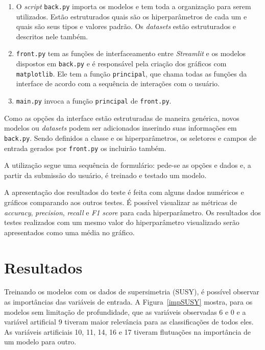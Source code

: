\documentclass[12pt]{article}
\begin{document}
\begin{enumerate}
	\item O \textit{script} \texttt{back.py} importa os modelos e tem toda a organização para serem utilizados.
	Estão estruturados quais são os hiperparâmetros de cada um e quais são seus tipos e valores padrão.
	Os \textit{datasets} estão estruturados e descritos nele também.
	
	\item \texttt{front.py} tem as funções de interfaceamento entre \textit{Streamlit} e os modelos dispostos em \texttt{back.py} e é responsável pela criação dos gráficos com \texttt{matplotlib}.
	Ele tem a função \texttt{principal}, que chama todas as funções da interface de acordo com a sequência de interações com o usuário.
	
	\item \texttt{main.py} invoca a função \texttt{principal} de \texttt{front.py}.
\end{enumerate} 

Como as opções da interface estão estruturadas de maneira genérica, novos modelos ou \textit{datasets} podem ser adicionados inserindo suas informações em \texttt{back.py}. 
Sendo definidos a classe e os hiperparâmetros, os seletores e campos de entrada gerados por \texttt{front.py} os incluirão também.

A utilização segue uma sequência de formulário: 
pede-se as opções e dados e, a partir da submissão do usuário, é treinado e testado um modelo.

A apresentação dos resultados do teste é feita com alguns dados numéricos e gráficos comparando aos outros testes.
É possível visualizar as métricas de \textit{accuracy}, \textit{precision}, \textit{recall} e \textit{F1 score} para cada hiperparâmetro.
Os resultados dos testes realizados com um mesmo valor do hiperparâmetro visualizado serão apresentados como uma média no gráfico.

\section{Resultados}

Treinando os modelos com os dados de supersimetria (SUSY), é possível observar as importâncias das variáveis de entrada.
A Figura~\ref{impSUSY} mostra, para os modelos sem limitação de profundidade, que as variáveis observadas 6 e 0 e a variável artificial 9 tiveram maior relevância para as classificações de todos eles.
As variáveis artificiais 10, 11, 14, 16 e 17 tiveram flutuações na importância de um modelo para outro. 
\end{document}
